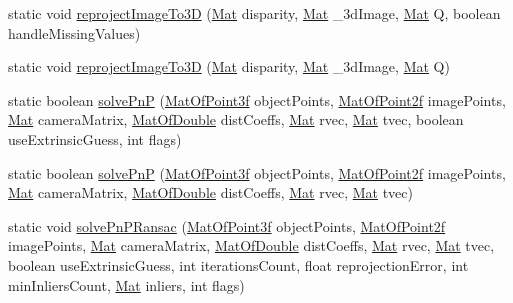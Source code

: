 \begin{DoxyCompactItemize}
\item 
static void \mbox{\hyperlink{classorg_1_1opencv_1_1calib3d_1_1_calib3d_a50f6f6b67af40abd54cd9b8bebce4c34}{reproject\+Image\+To3D}} (\mbox{\hyperlink{classorg_1_1opencv_1_1core_1_1_mat}{Mat}} disparity, \mbox{\hyperlink{classorg_1_1opencv_1_1core_1_1_mat}{Mat}} \+\_\+3d\+Image, \mbox{\hyperlink{classorg_1_1opencv_1_1core_1_1_mat}{Mat}} Q, boolean handle\+Missing\+Values)
\item 
static void \mbox{\hyperlink{classorg_1_1opencv_1_1calib3d_1_1_calib3d_ab0607d0453e4adb44ff480027b3296b7}{reproject\+Image\+To3D}} (\mbox{\hyperlink{classorg_1_1opencv_1_1core_1_1_mat}{Mat}} disparity, \mbox{\hyperlink{classorg_1_1opencv_1_1core_1_1_mat}{Mat}} \+\_\+3d\+Image, \mbox{\hyperlink{classorg_1_1opencv_1_1core_1_1_mat}{Mat}} Q)
\item 
static boolean \mbox{\hyperlink{classorg_1_1opencv_1_1calib3d_1_1_calib3d_ad53b5772231896ec5baf3bde5e9ba319}{solve\+PnP}} (\mbox{\hyperlink{classorg_1_1opencv_1_1core_1_1_mat_of_point3f}{Mat\+Of\+Point3f}} object\+Points, \mbox{\hyperlink{classorg_1_1opencv_1_1core_1_1_mat_of_point2f}{Mat\+Of\+Point2f}} image\+Points, \mbox{\hyperlink{classorg_1_1opencv_1_1core_1_1_mat}{Mat}} camera\+Matrix, \mbox{\hyperlink{classorg_1_1opencv_1_1core_1_1_mat_of_double}{Mat\+Of\+Double}} dist\+Coeffs, \mbox{\hyperlink{classorg_1_1opencv_1_1core_1_1_mat}{Mat}} rvec, \mbox{\hyperlink{classorg_1_1opencv_1_1core_1_1_mat}{Mat}} tvec, boolean use\+Extrinsic\+Guess, int flags)
\item 
static boolean \mbox{\hyperlink{classorg_1_1opencv_1_1calib3d_1_1_calib3d_a763c6212499a27e160dfbc34439cfce5}{solve\+PnP}} (\mbox{\hyperlink{classorg_1_1opencv_1_1core_1_1_mat_of_point3f}{Mat\+Of\+Point3f}} object\+Points, \mbox{\hyperlink{classorg_1_1opencv_1_1core_1_1_mat_of_point2f}{Mat\+Of\+Point2f}} image\+Points, \mbox{\hyperlink{classorg_1_1opencv_1_1core_1_1_mat}{Mat}} camera\+Matrix, \mbox{\hyperlink{classorg_1_1opencv_1_1core_1_1_mat_of_double}{Mat\+Of\+Double}} dist\+Coeffs, \mbox{\hyperlink{classorg_1_1opencv_1_1core_1_1_mat}{Mat}} rvec, \mbox{\hyperlink{classorg_1_1opencv_1_1core_1_1_mat}{Mat}} tvec)
\item 
static void \mbox{\hyperlink{classorg_1_1opencv_1_1calib3d_1_1_calib3d_a32d3d3e19cf81dddf71cd8527fb806e5}{solve\+Pn\+P\+Ransac}} (\mbox{\hyperlink{classorg_1_1opencv_1_1core_1_1_mat_of_point3f}{Mat\+Of\+Point3f}} object\+Points, \mbox{\hyperlink{classorg_1_1opencv_1_1core_1_1_mat_of_point2f}{Mat\+Of\+Point2f}} image\+Points, \mbox{\hyperlink{classorg_1_1opencv_1_1core_1_1_mat}{Mat}} camera\+Matrix, \mbox{\hyperlink{classorg_1_1opencv_1_1core_1_1_mat_of_double}{Mat\+Of\+Double}} dist\+Coeffs, \mbox{\hyperlink{classorg_1_1opencv_1_1core_1_1_mat}{Mat}} rvec, \mbox{\hyperlink{classorg_1_1opencv_1_1core_1_1_mat}{Mat}} tvec, boolean use\+Extrinsic\+Guess, int iterations\+Count, float reprojection\+Error, int min\+Inliers\+Count, \mbox{\hyperlink{classorg_1_1opencv_1_1core_1_1_mat}{Mat}} inliers, int flags)

\end{DoxyCompactItemize}
